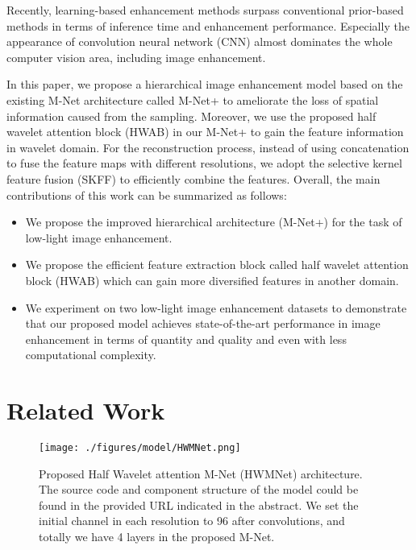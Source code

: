 \documentclass{article}
\begin{document}
Recently, learning-based enhancement methods surpass conventional prior-based methods in terms of inference time and enhancement performance. Especially the appearance of convolution neural network (CNN) almost dominates the whole computer vision area, including image enhancement.

In this paper, we propose a hierarchical image enhancement model based on the existing M-Net architecture called M-Net+ to ameliorate the loss of spatial information caused from the sampling. Moreover, we use the proposed half wavelet attention block (HWAB) in our M-Net+ to gain the feature information in wavelet domain. For the reconstruction process, instead of using concatenation to fuse the feature maps with different resolutions, we adopt the selective kernel feature fusion (SKFF) \cite{01} to efficiently combine the features. Overall, the main contributions of this work can be summarized as follows: 

\begin{itemize}
  \item We propose the improved hierarchical architecture (M-Net+) for the task of low-light image enhancement.
  \item We propose the efficient feature extraction block called half wavelet attention block (HWAB) which can gain more diversified features in another domain.
\item We experiment on two low-light image enhancement datasets to demonstrate that our proposed model achieves state-of-the-art performance in image enhancement in terms of quantity and quality and even with less computational complexity.
\end{itemize}

\section{Related Work}


\begin{figure*}[!t]
\centering
	\texttt{[image: ./figures/model/HWMNet.png]}
	\caption{Proposed Half Wavelet attention M-Net (HWMNet) architecture. The source code and component structure of the model could be found in the provided URL indicated in the abstract. We set the initial channel in each resolution to 96 after  convolutions, and totally we have 4 layers in the proposed M-Net.}
	\label{HWMNet}
\end{figure*}
\end{document}
